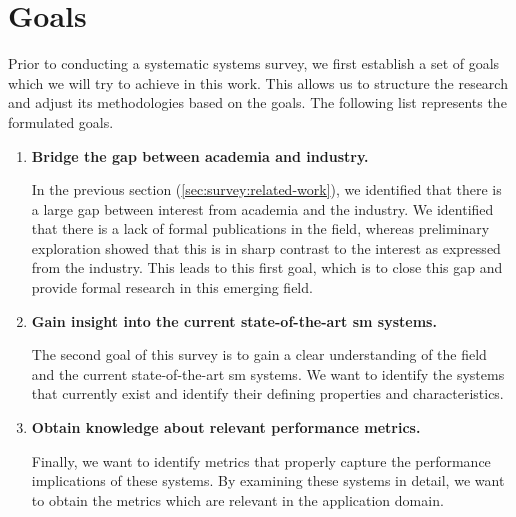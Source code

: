 \section{Goals}
\label{sec:survey:goals}


Prior to conducting a systematic systems survey, we first establish a set of goals which we will try to achieve in this work. This allows us to structure the research and adjust its methodologies based on the goals. The following list represents the formulated goals.

\begin{enumerate}[label=\textbf{G\arabic*}, leftmargin=3\parindent]
    \item \textbf{Bridge the gap between academia and industry.}
    \label{g-1}
    
    In the previous section (\cref{sec:survey:related-work}), we identified that there is a large gap between interest from academia and the industry. We identified that there is a lack of formal publications in the field, whereas preliminary exploration showed that this is in sharp contrast to the interest as expressed from the industry. This leads to this first goal, which is to close this gap and provide formal research in this emerging field.
    
    \item \textbf{Gain insight into the current state-of-the-art \gls{sm} systems.}
    \label{g-2}
    
    The second goal of this survey is to gain a clear understanding of the field and the current state-of-the-art \gls{sm} systems. We want to identify the systems that currently exist and identify their defining properties and characteristics.

    \item \textbf{Obtain knowledge about relevant performance metrics.}
    \label{g-3}
    
    Finally, we want to identify metrics that properly capture the performance implications of these systems. By examining these systems in detail, we want to obtain the metrics which are relevant in the application domain. 

\end{enumerate}

